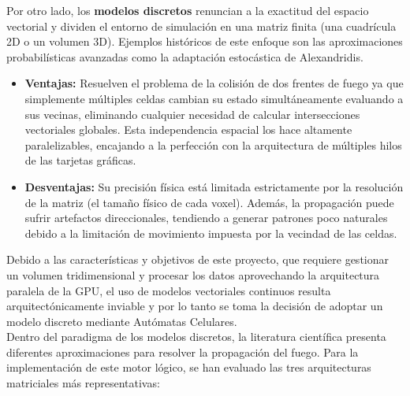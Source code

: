         Por otro lado, los \textbf{modelos discretos} renuncian a la exactitud del espacio vectorial y dividen el entorno de simulación en una matriz finita (una cuadrícula 2D o un volumen 3D)\cite{mdiscretos}. Ejemplos históricos de este enfoque son las aproximaciones probabilísticas avanzadas como la adaptación estocástica de Alexandridis\cite{alexandridis2008}. 
        \begin{itemize}
            \item \textbf{Ventajas:} Resuelven el problema de la colisión de dos frentes de fuego ya que simplemente múltiples celdas cambian su estado simultáneamente evaluando a sus vecinas, eliminando cualquier necesidad de calcular intersecciones vectoriales globales. Esta independencia espacial los hace altamente paralelizables, encajando a la perfección con la arquitectura de múltiples hilos de las tarjetas gráficas.
            \item \textbf{Desventajas:} Su precisión física está limitada estrictamente por la resolución de la matriz (el tamaño físico de cada voxel). Además, la propagación puede sufrir artefactos direccionales, tendiendo a generar patrones poco naturales debido a la limitación de movimiento impuesta por la vecindad de las celdas.
        \end{itemize}


        Debido a las características y objetivos de este proyecto, que requiere gestionar un volumen tridimensional y procesar los datos aprovechando la arquitectura paralela de la GPU, el uso de modelos vectoriales continuos resulta arquitectónicamente inviable y por lo tanto se toma la decisión de adoptar un modelo discreto mediante Autómatas Celulares.\\
        
        Dentro del paradigma de los modelos discretos, la literatura científica presenta diferentes aproximaciones para resolver la propagación del fuego. Para la implementación de este motor lógico, se han evaluado las tres arquitecturas matriciales más representativas:

